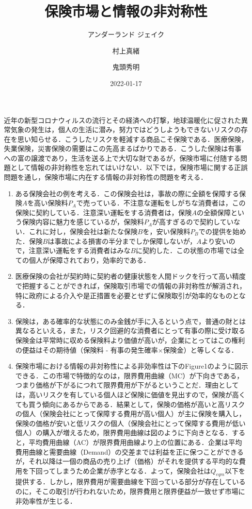 \documentclass[
]{ltjarticle}
\title{保険市場と情報の非対称性}
\author{アンダーランド ジェイク \and 村上真緒 \and 鬼頭秀明}
\date{2022-01-17}
\begin{document}
\maketitle

近年の新型コロナウィルスの流行とその経済への打撃，地球温暖化に促された異常気象の発生は，個人の生活に潜み，努力ではどうしようもできないリスクの存在を思い知らせる．こうしたリスクを軽減する商品こそ保険である．医療保険，失業保険，災害保険の需要はこの先高まるばかりである．こうした保険は有事への富の譲渡であり，生活を送る上で大切な財であるが，保険市場に付随する問題として情報の非対称性を忘れてはいけない．以下では，保険市場に関する正誤問題を通し，保険市場に内在する情報の非対称性の問題を考える．

\begin{enumerate}
\item ある保険会社の例を考える．この保険会社は，事故の際に全額を保障する保険$A$を高い保険料$P_A$で売っている．不注意な運転をしがちな消費者は，この保険に契約している．注意深い運転をする消費者は，保険$A$の全額保障という保険内容に魅力を感じているが，保険料$P_A$が高すぎるので契約していない．これに対し，保険会社は新たな保険$B$を，安い保険料$P_B$での提供を始めた．保険$B$は事故による損害の半分までしか保障しないが，$A$より安いので，注意深い運転をする消費者はみな$B$に契約した．この状態の市場では全ての個人が保障されており，効率的である．

\item 医療保険の会社が契約時に契約者の健康状態を人間ドックを行って高い精度で把握することができれば，保険取引市場での情報の非対称性が解消され，特に政府による介入や是正措置を必要とせずに保険取引が効率的なものとなる．

\item 保険は，ある確率的な状態にのみ金銭が手に入るという点で，普通の財とは異なるといえる，また，リスク回避的な消費者にとって有事の際に受け取る保険金は平常時に収める保険料より価値が高いが，企業にとってはこの権利の便益はその期待値（保険料 - 有事の発生確率$\times$保険金）と等しくなる．

\item 保険市場における情報の非対称性による非効率性は下のFigure1のように図示できる．この市場で特徴的なのは，限界費用曲線（MC）が下向きである，つまり価格が下がるにつれて限界費用が下がるということだ．理由としては，高いリスクを有している個人ほど保険に価値を見出すので，保険が高くても買う傾向にあるからである．結果として，保険の価格が高いと高リスクの個人（保険会社にとって保障する費用が高い個人）が主に保険を購入し，保険の価格が安いと低リスクの個人（保険会社にとって保障する費用が低い個人）の購入が増えるため，限界費用曲線は図のように下向きとなる．すると，平均費用曲線（AC）が限界費用曲線より上の位置にある．企業は平均費用曲線と需要曲線（Demand）の交差までは利益を正に保つことができるが，それ以降は一個の商品の売り上げ（価格）がそれを提供する平均的な費用を下回ってしまうため企業が赤字となる．よって，保険会社は$Q_{eqm}$以下を提供する．しかし，限界費用が需要曲線を下回っている部分が存在しているのに，そこの取引が行われないため，限界費用と限界便益が一致せず市場に非効率性が生じる．

\end{enumerate}
\end{document}
